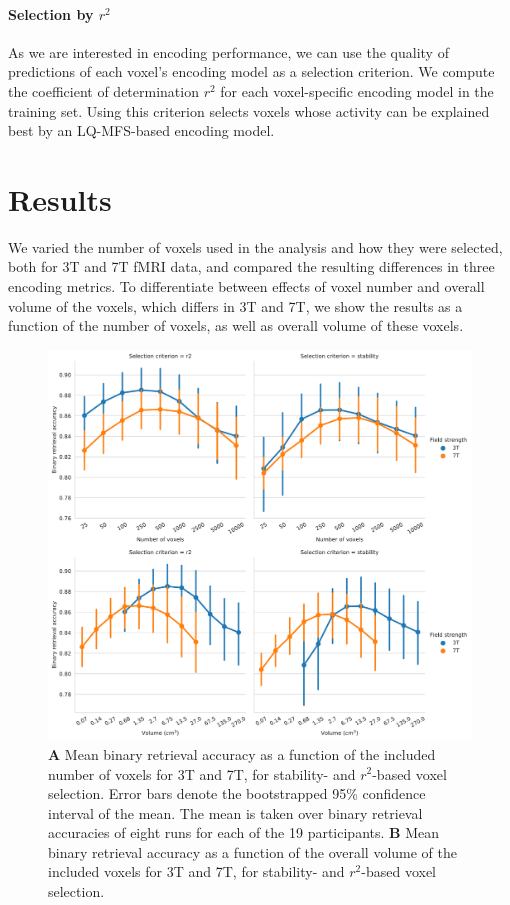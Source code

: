 \paragraph{Selection by $r^2$}

As we are interested in encoding performance, we can use the quality of
predictions of each voxel's encoding model as a selection criterion. We compute
the coefficient of determination $r^2$ for each voxel-specific encoding model
in the training set. Using this criterion selects voxels whose activity can be
explained best by an LQ-MFS-based encoding model.

\section*{Results}

We varied the number of voxels used in the analysis and how they were selected,
both for 3T and 7T f{MRI} data, and compared the resulting differences in
three encoding metrics. To differentiate between effects of voxel number and
overall volume of the voxels, which differs in 3T and 7T, we show the
results as a function of the number of voxels, as well as overall volume of
these voxels.

\begin{figure}
  \centering
  \includegraphics[width=\linewidth]{pics/binary.pdf}
	
  \caption{\textbf{A} Mean binary retrieval accuracy as a function of the
  included number of voxels for 3T and 7T, for stability- and $r^2$-based
  voxel selection. Error bars denote the bootstrapped 95\% confidence interval
  of the mean. The mean is taken over binary retrieval accuracies of eight runs
  for each of the 19 participants. \textbf{B} Mean binary retrieval accuracy as
a function of the overall volume of the included voxels for 3T and 7T, for
stability- and $r^2$-based voxel selection.
}

 \label{fig:binary_retrieval}\end{figure}

